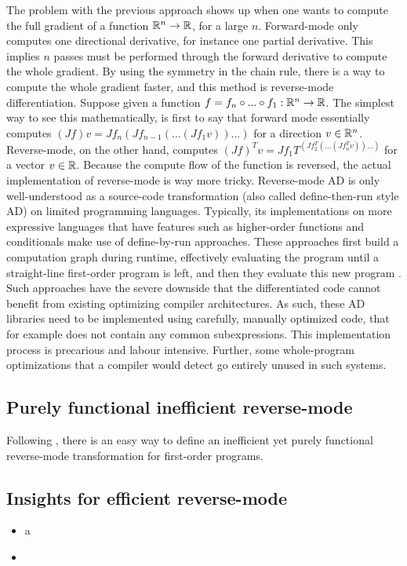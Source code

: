 The problem with the previous approach shows up when one wants to compute the full gradient of a function $\mathbb{R}^n\to\mathbb{R}$, for a large $n$. 
Forward-mode only computes one directional derivative, for instance one partial derivative. This implies $n$ passes must be performed through the forward derivative to compute the whole gradient.
By using the symmetry in the chain rule, there is a way to compute the whole gradient faster, and this method is reverse-mode differentiation.
Suppose given a function $f=f_n\circ...\circ f_1 :\mathbb{R}^n\to\mathbb{R}$. 
The simplest way to see this mathematically, is first to say that forward mode essentially computes $(Jf)v=Jf_n(Jf_{n-1}(...(Jf_1v))...)$ for a direction $v\in\mathbb{R}^n$. 
Reverse-mode, on the other hand, computes $(Jf)^Tv =Jf_1T^(Jf_{2}^T(...(Jf_n^Tv))...)$ for a vector $v\in\mathbb{R}$. 
Because the compute flow of the function is reversed, the actual implementation of reverse-mode is way more tricky. 
Reverse-mode AD is only well-understood as a source-code transformation (also called define-then-run
style AD) on limited programming languages. Typically, its implementations
on more expressive languages that have features such as higher-order functions and conditionals
make use of define-by-run approaches. These approaches first build a computation graph during runtime, effectively evaluating the program until a straight-line
first-order program is left, and then they evaluate this new program \cite{carpenter2015stan,paszke2017automatic}. 
Such approaches have the severe downside that the differentiated code cannot benefit from existing optimizing compiler architectures. As such, these AD libraries
need to be implemented using carefully, manually optimized code, that for example does not contain any common subexpressions. This implementation process
is precarious and labour intensive. Further, some whole-program optimizations
that a compiler would detect go entirely unused in such systems.

\subsection{Purely functional inefficient reverse-mode}

Following \cite{pearlmutter2008reverse}, there is an easy way to define an inefficient yet purely functional reverse-mode transformation for first-order programs.

\subsection{Insights for efficient reverse-mode}

\begin{itemize}
    \item a
    \item  
\end{itemize}